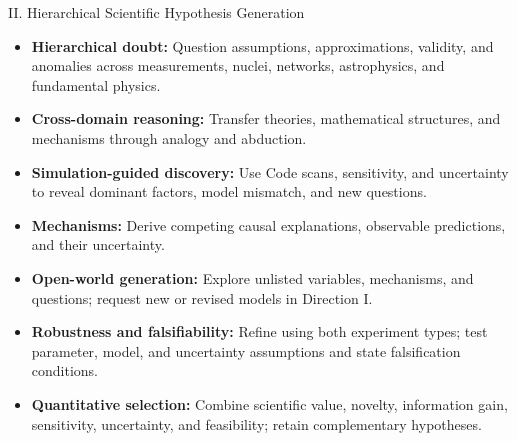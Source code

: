 \setsource{}
\begin{frame}[t,label=md-56]{II. Hierarchical Scientific Hypothesis Generation}
\footnotesize
\begin{itemize}
\setlength{\itemsep}{0.15em}
    \item \textbf{Hierarchical doubt:} Question assumptions, approximations,
    validity, and anomalies across measurements, nuclei, networks,
    astrophysics, and fundamental physics.
    \item \textbf{Cross-domain reasoning:} Transfer theories, mathematical
    structures, and mechanisms through analogy and abduction.
    \item \textbf{Simulation-guided discovery:} Use Code scans, sensitivity,
    and uncertainty to reveal dominant factors, model mismatch, and new questions.
    \item \textbf{Mechanisms:} Derive competing causal explanations,
    observable predictions, and their uncertainty.
    \item \textbf{Open-world generation:} Explore unlisted variables,
    mechanisms, and questions; request new or revised models in Direction I.
    \item \textbf{Robustness and falsifiability:} Refine using both experiment
    types; test parameter, model, and uncertainty assumptions and state
    falsification conditions.
    \item \textbf{Quantitative selection:} Combine scientific value, novelty,
    information gain, sensitivity, uncertainty, and feasibility;
    retain complementary hypotheses.
\end{itemize}
\end{frame}

